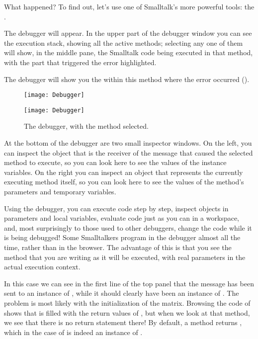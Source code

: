 \documentclass[a4paper,10pt,twoside]{book}
\begin{document}
{\noindent
What happened? To find out, let's use one of Smalltalk's more powerful tools: the .

The debugger will appear.
In the upper part of the debugger window you can see the execution stack, showing all the active methods; selecting any one of them will show, in the middle pane, the Smalltalk code being executed in that method, with the part that triggered the error highlighted.

The debugger will show you the  within this method where the error occurred ().

\begin{figure}[ht]
\ifluluelse
	{\centerline {\texttt{[image: Debugger]}}}
	{\centerline {\texttt{[image: Debugger]}}}
\caption{The debugger, with the method   selected.
}
\end{figure}

At the bottom of the debugger are two small inspector windows.  On the left, you can inspect the object that is the receiver of the message that caused the selected method to execute, so you can look here to see the values of the instance variables.
On the right you can inspect an object that represents the currently executing method itself, so you can look here to see the values of the method's parameters and temporary variables.

Using the debugger, you can execute code step by step, inspect objects in parameters and local variables, evaluate code just as you can in a workspace, and, most surprisingly to those used to other debuggers, change the code while it is being debugged! Some Smalltalkers program in the debugger almost all the time, rather than in the browser.  The advantage of this is that you see the method that you are writing as it will be executed, with real parameters in the actual execution context.

In this case we can see in the first line of the top panel that the  message has been sent to an instance of , while it should clearly have been an instance of .
The problem is most likely with the initialization of the  matrix.
Browsing the code of  shows that  is filled with the return values of , but when we look at that method, we see that there is no return statement there!
By default, a method returns , which in the case of  is indeed an instance of .

}
\end{document}
